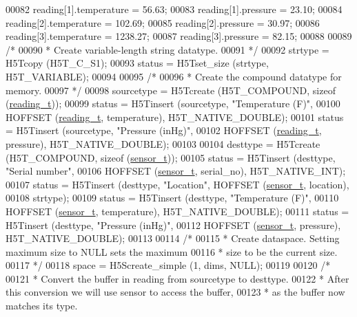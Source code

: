 \begin{DoxyCode}
00082     reading[1].temperature = 56.63;
00083     reading[1].pressure = 23.10;
00084     reading[2].temperature = 102.69;
00085     reading[2].pressure = 30.97;
00086     reading[3].temperature = 1238.27;
00087     reading[3].pressure = 82.15;
00088 
00089     \textcolor{comment}{/*}
00090 \textcolor{comment}{     * Create variable-length string datatype.}
00091 \textcolor{comment}{     */}
00092     strtype = H5Tcopy (H5T\_C\_S1);
00093     status = H5Tset\_size (strtype, H5T\_VARIABLE);
00094 
00095     \textcolor{comment}{/*}
00096 \textcolor{comment}{     * Create the compound datatype for memory.}
00097 \textcolor{comment}{     */}
00098     sourcetype = H5Tcreate (H5T\_COMPOUND, \textcolor{keyword}{sizeof} (\hyperlink{structreading__t}{reading\_t}));
00099     status = H5Tinsert (sourcetype, \textcolor{stringliteral}{"Temperature (F)"},
00100                 HOFFSET (\hyperlink{structreading__t}{reading\_t}, temperature), H5T\_NATIVE\_DOUBLE);
00101     status = H5Tinsert (sourcetype, \textcolor{stringliteral}{"Pressure (inHg)"},
00102                 HOFFSET (\hyperlink{structreading__t}{reading\_t}, pressure), H5T\_NATIVE\_DOUBLE);
00103 
00104     desttype = H5Tcreate (H5T\_COMPOUND, \textcolor{keyword}{sizeof} (\hyperlink{structsensor__t}{sensor\_t}));
00105     status = H5Tinsert (desttype, \textcolor{stringliteral}{"Serial number"},
00106                 HOFFSET (\hyperlink{structsensor__t}{sensor\_t}, serial\_no), H5T\_NATIVE\_INT);
00107     status = H5Tinsert (desttype, \textcolor{stringliteral}{"Location"}, HOFFSET (\hyperlink{structsensor__t}{sensor\_t}, location),
00108                 strtype);
00109     status = H5Tinsert (desttype, \textcolor{stringliteral}{"Temperature (F)"},
00110                 HOFFSET (\hyperlink{structsensor__t}{sensor\_t}, temperature), H5T\_NATIVE\_DOUBLE);
00111     status = H5Tinsert (desttype, \textcolor{stringliteral}{"Pressure (inHg)"},
00112                 HOFFSET (\hyperlink{structsensor__t}{sensor\_t}, pressure), H5T\_NATIVE\_DOUBLE);
00113 
00114     \textcolor{comment}{/*}
00115 \textcolor{comment}{     * Create dataspace.  Setting maximum size to NULL sets the maximum}
00116 \textcolor{comment}{     * size to be the current size.}
00117 \textcolor{comment}{     */}
00118     space = H5Screate\_simple (1, dims, NULL);
00119 
00120     \textcolor{comment}{/*}
00121 \textcolor{comment}{     * Convert the buffer in reading from sourcetype to desttype.}
00122 \textcolor{comment}{     * After this conversion we will use sensor to access the buffer,}
00123 \textcolor{comment}{     * as the buffer now matches its type.}

\end{DoxyCode}
